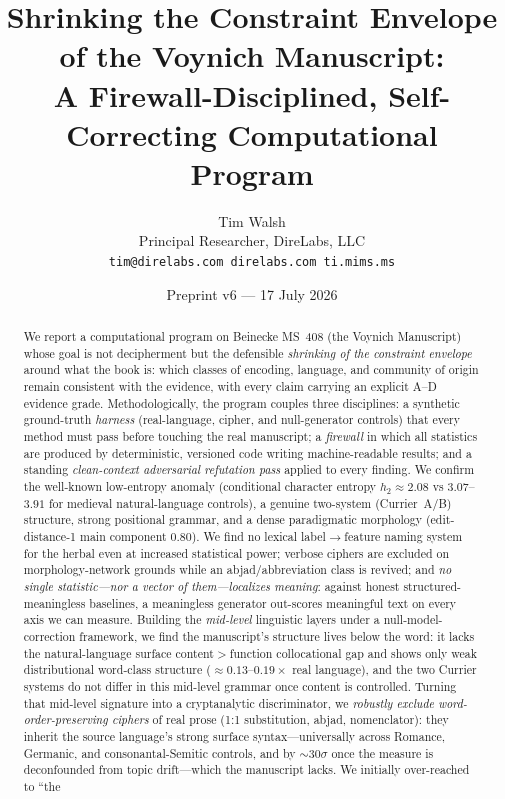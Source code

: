 \documentclass[11pt]{article}
\title{\textbf{Shrinking the Constraint Envelope of the Voynich Manuscript:\\
A Firewall-Disciplined, Self-Correcting Computational Program}}
\author{Tim Walsh \\ \small Principal Researcher, DireLabs, LLC \\
\small \texttt{tim@direlabs.com \quad direlabs.com \quad ti.mims.ms}}
\date{Preprint v6 --- 17 July 2026}
\begin{document}
\maketitle

\begin{abstract}
\noindent We report a computational program on Beinecke MS~408 (the Voynich
Manuscript) whose goal is not decipherment but the defensible \emph{shrinking of the
constraint envelope} around what the book is: which classes of encoding, language,
and community of origin remain consistent with the evidence, with every claim carrying
an explicit A--D evidence grade. Methodologically, the program couples three
disciplines: a synthetic ground-truth \emph{harness} (real-language, cipher, and
null-generator controls) that every method must pass before touching the real
manuscript; a \emph{firewall} in which all statistics are produced by deterministic,
versioned code writing machine-readable results; and a standing \emph{clean-context
adversarial refutation pass} applied to every finding. We confirm the well-known
low-entropy anomaly (conditional character entropy $h_2\approx 2.08$ vs
$3.07$--$3.91$ for medieval natural-language controls), a genuine two-system
(Currier~A/B) structure, strong positional grammar, and a dense paradigmatic
morphology (edit-distance-1 main component $0.80$). We find no lexical
label$\rightarrow$feature naming system for the herbal even at increased statistical
power; verbose ciphers are excluded on morphology-network grounds while an
abjad/abbreviation class is revived; and \emph{no single statistic---nor a vector of
them---localizes meaning}: against honest structured-meaningless baselines, a
meaningless generator out-scores meaningful text on every axis we can measure. Building
the \emph{mid-level} linguistic layers under a null-model-correction framework, we find
the manuscript's structure lives below the word: it lacks the natural-language surface
content$>$function collocational gap and shows only weak distributional word-class
structure ($\approx\!0.13$--$0.19\times$ real language), and the two Currier systems do
not differ in this mid-level grammar once content is controlled. Turning that mid-level
signature into a cryptanalytic discriminator, we \emph{robustly exclude
word-order-preserving ciphers} of real prose (1:1 substitution, abjad, nomenclator): they
inherit the source language's strong surface syntax---universally across Romance, Germanic,
and consonantal-Semitic controls, and by $\sim\!30\sigma$ once the measure is deconfounded
from topic drift---which the manuscript lacks. We initially over-reached to ``the

\end{abstract}
\end{document}
